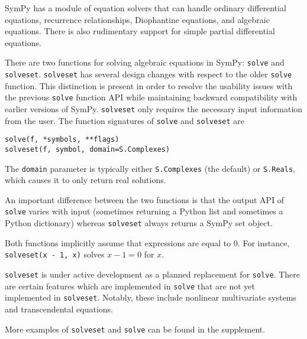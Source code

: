 SymPy has a module of equation solvers that can handle ordinary differential
equations, recurrence relationships, Diophantine equations, and algebraic
equations. There is also
rudimentary support for simple partial differential equations.

There are two functions for solving algebraic equations in SymPy: \texttt{solve}
and \texttt{solveset}.
\texttt{solveset} has several design changes with respect to the older
\texttt{solve} function. This distinction is present in order to resolve the
usability issues with the
previous \texttt{solve} function API while maintaining backward compatibility
with earlier versions of SymPy.
\texttt{solveset} only requires the necessary input information from the user.
The function signatures of \texttt{solve} and \texttt{solveset} are
\begin{verbatim}
solve(f, *symbols, **flags)
solveset(f, symbol, domain=S.Complexes)
\end{verbatim}
The \texttt{domain} parameter is typically either \texttt{S.Complexes} (the
default) or \texttt{S.Reals}, which causes it to only return real solutions.

An important difference between the two functions is that the output API of \texttt{solve} varies with input (sometimes returning a Python list and sometimes a Python dictionary) whereas
\texttt{solveset} always returns
a SymPy set object.

Both functions implicitly assume that expressions are equal to 0. For
instance, \texttt{solveset(x - 1, x)} solves $x - 1 = 0$ for $x$.

\texttt{solveset} is under active development as a planned replacement for
\texttt{solve}. There are certain features which are implemented in
\texttt{solve} that are not yet implemented in \texttt{solveset}. Notably,
these include nonlinear multivariate systems and transcendental equations.

More examples of \texttt{solveset} and \texttt{solve} can be found in the
supplement.
